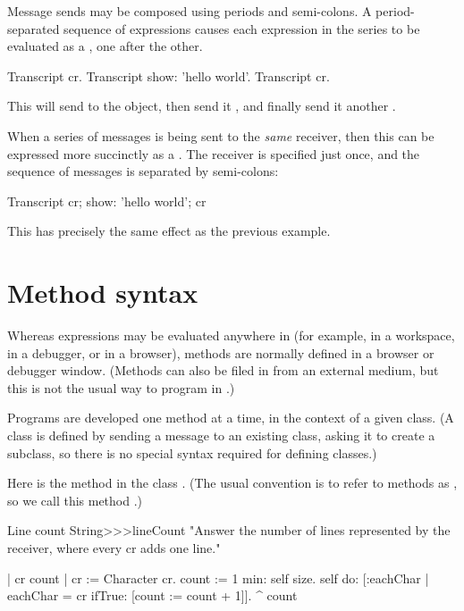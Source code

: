 \documentclass[a4paper,10pt,twoside]{book}
\begin{document}
Message sends may be composed using periods and semi-colons.
A period-separated sequence of expressions causes each expression in the series to be evaluated as a , one after the other.

\begin{code}{}
Transcript cr.
Transcript show: 'hello world'.
Transcript cr.
\end{code}

\noindent
This will send  to the  object, then send it , and finally send it another .

When a series of messages is being sent to the \emph{same} receiver, then this can be expressed more succinctly as a .
The receiver is specified just once, and the sequence of messages is separated by semi-colons:

\begin{code}{}
Transcript 
	cr;
    show: 'hello world';
    cr
\end{code}
This has precisely the same effect as the previous example.

\section{Method syntax}

Whereas expressions may be evaluated anywhere in \sq (for example, in a workspace, in a debugger, or in a browser), methods are normally defined in a browser or debugger window.
(Methods can also be filed in from an external medium, but this is not the usual way to program in \sq.)

Programs are developed one method at a time, in the context of a given class.
(A class is defined by sending a message to an existing class, asking it to create a subclass, so there is no special syntax required for defining classes.)

Here is the method  in the class .
(The usual convention is to refer to methods as , so we call this method .)

\begin{method}[lineCount]{Line count}
String>>>lineCount
   "Answer the number of lines represented by the receiver,
   where every cr adds one line."
   
   | cr count |
   cr := Character cr.
   count := 1 min: self size.
   self do: [:eachChar | 
      eachChar = cr ifTrue: [count := count + 1]].
   ^ count
\end{method}
\end{document}
